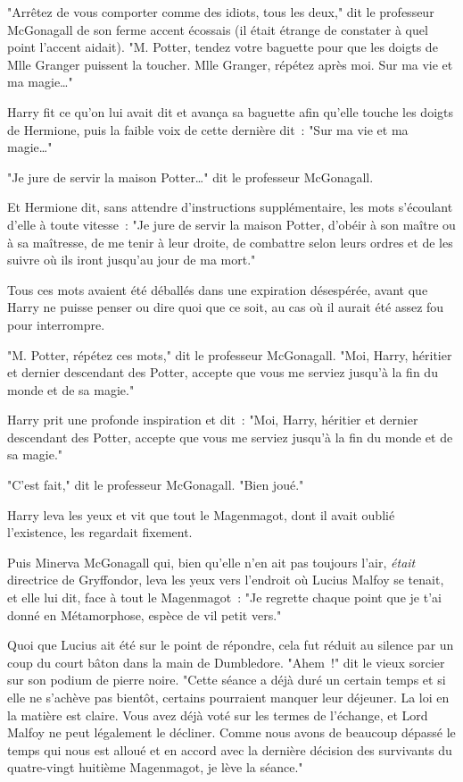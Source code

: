"Arrêtez de vous comporter comme des idiots, tous les deux," dit le professeur McGonagall de son ferme accent écossais (il était étrange de constater à quel point l'accent aidait). "M. Potter, tendez votre baguette pour que les doigts de Mlle Granger puissent la toucher. Mlle Granger, répétez après moi. Sur ma vie et ma magie…"

Harry fit ce qu'on lui avait dit et avança sa baguette afin qu'elle touche les doigts de Hermione, puis la faible voix de cette dernière dit~: "Sur ma vie et ma magie…"

"Je jure de servir la maison Potter…" dit le professeur McGonagall.

Et Hermione dit, sans attendre d'instructions supplémentaire, les mots s'écoulant d'elle à toute vitesse~: "Je jure de servir la maison Potter, d'obéir à son maître ou à sa maîtresse, de me tenir à leur droite, de combattre selon leurs ordres et de les suivre où ils iront jusqu'au jour de ma mort."

Tous ces mots avaient été déballés dans une expiration désespérée, avant que Harry ne puisse penser ou dire quoi que ce soit, au cas où il aurait été assez fou pour interrompre.

"M. Potter, répétez ces mots," dit le professeur McGonagall. "Moi, Harry, héritier et dernier descendant des Potter, accepte que vous me serviez jusqu'à la fin du monde et de sa magie."

Harry prit une profonde inspiration et dit~: "Moi, Harry, héritier et dernier descendant des Potter, accepte que vous me serviez jusqu'à la fin du monde et de sa magie."

"C'est fait," dit le professeur McGonagall. "Bien joué."

Harry leva les yeux et vit que tout le Magenmagot, dont il avait oublié l'existence, les regardait fixement.

Puis Minerva McGonagall qui, bien qu'elle n'en ait pas toujours l'air, \emph{était} directrice de Gryffondor, leva les yeux vers l'endroit où Lucius Malfoy se tenait, et elle lui dit, face à tout le Magenmagot~: "Je regrette chaque point que je t'ai donné en Métamorphose, espèce de vil petit vers."

Quoi que Lucius ait été sur le point de répondre, cela fut réduit au silence par un coup du court bâton dans la main de Dumbledore. "Ahem~!" dit le vieux sorcier sur son podium de pierre noire. "Cette séance a déjà duré un certain temps et si elle ne s'achève pas bientôt, certains pourraient manquer leur déjeuner. La loi en la matière est claire. Vous avez déjà voté sur les termes de l'échange, et Lord Malfoy ne peut légalement le décliner. Comme nous avons de beaucoup dépassé le temps qui nous est alloué et en accord avec la dernière décision des survivants du quatre-vingt huitième Magenmagot, je lève la séance."

